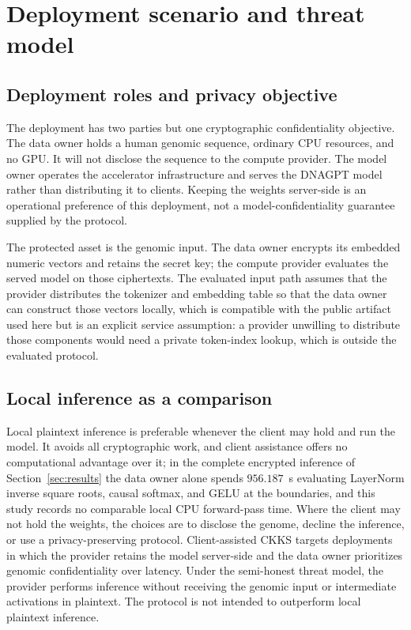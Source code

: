 
\section{Deployment scenario and threat model}
\label{sec:threat-model}

\subsection{Deployment roles and privacy objective}
The deployment has two parties but one cryptographic confidentiality objective. The data owner
holds a human genomic sequence, ordinary CPU resources, and no GPU. It will not disclose the
sequence to the compute provider. The model owner operates the accelerator infrastructure and
serves the DNAGPT model rather than distributing it to clients. Keeping the weights server-side is
an operational preference of this deployment, not a model-confidentiality guarantee supplied by
the protocol.

The protected asset is the genomic input. The data owner encrypts its embedded numeric vectors and
retains the secret key; the compute provider evaluates the served model on those ciphertexts. The
evaluated input path assumes that the provider distributes the tokenizer and embedding table so that
the data owner can construct those vectors locally, which is compatible with the public artifact
used here but is an explicit service assumption: a provider unwilling to distribute those components
would need a private token-index lookup, which is outside the evaluated protocol.

\subsection{Local inference as a comparison}
Local plaintext inference is preferable whenever the client may hold and run the model. It avoids
all cryptographic work, and client assistance offers no computational advantage over it; in the
complete encrypted inference of Section~\ref{sec:results} the data owner alone spends $956.187$~s
evaluating LayerNorm inverse square roots, causal softmax, and GELU at the boundaries, and this
study records no comparable local CPU forward-pass time. Where the client may not hold the weights,
the choices are to disclose the genome, decline the inference, or use a privacy-preserving protocol.
Client-assisted CKKS targets deployments in which the provider retains the model server-side and
the data owner prioritizes genomic confidentiality over latency. Under the semi-honest threat model,
the provider performs inference without receiving the genomic input or intermediate activations in
plaintext. The protocol is not intended to outperform local plaintext inference.


